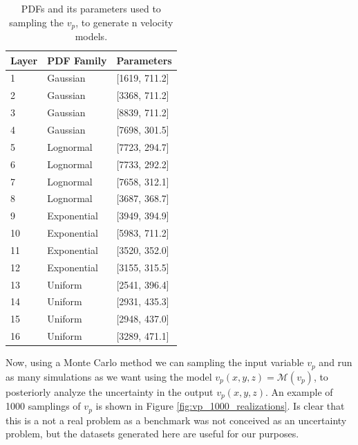 \begin{table}[H]
\begin{center}
    \begin{tabular}{|l|l|l|}
    \hline
    \textbf{Layer} & \textbf{PDF Family}                & \textbf{Parameters}           \\ \hline
    1     & Gaussian & [1619, 711.2] \\ \hline
    2     & Gaussian & [3368, 711.2]               \\ \hline
    3     & Gaussian & [8839, 711.2]               \\ \hline
    4     & Gaussian & [7698, 301.5]               \\ \hline
    5     & Lognormal   & [7723, 294.7]               \\ \hline
    6     & Lognormal   & [7733, 292.2]               \\ \hline
    7     & Lognormal   & [7658, 312.1]               \\ \hline
    8     & Lognormal   & [3687, 368.7]               \\ \hline
    9     & Exponential & [3949, 394.9]             \\ \hline
    10   & Exponential & [5983, 711.2]               \\ \hline
    11   & Exponential & [3520, 352.0]              \\ \hline
    12   & Exponential & [3155, 315.5]              \\ \hline
    13   & Uniform     & [2541, 396.4]              \\ \hline
    14   & Uniform     & [2931, 435.3]              \\ \hline
    15   & Uniform     & [2948, 437.0]             \\ \hline
    16   & Uniform     & [3289, 471.1]              \\ \hline
    \end{tabular}
    \caption {PDFs and its parameters used to sampling the $v_{p}$, to generate n velocity models.}
    \label{tab:PDFsOfVp}
    \end{center}
\end{table}

Now, using a Monte Carlo method we can sampling the input variable $v_{p}$ and run as many simulations as we want using the model $v_{p}(x,y,z) = \mathcal{M}(v_{p})$, to posteriorly analyze the uncertainty in the output $v_{p}(x,y,z)$. An example of 1000 samplings of $v_{p}$ is shown in Figure \ref{fig:vp_1000_realizations}. Is clear that this is a not a real problem as a benchmark was not conceived as an uncertainty problem, but the datasets generated here are useful for our purposes.

